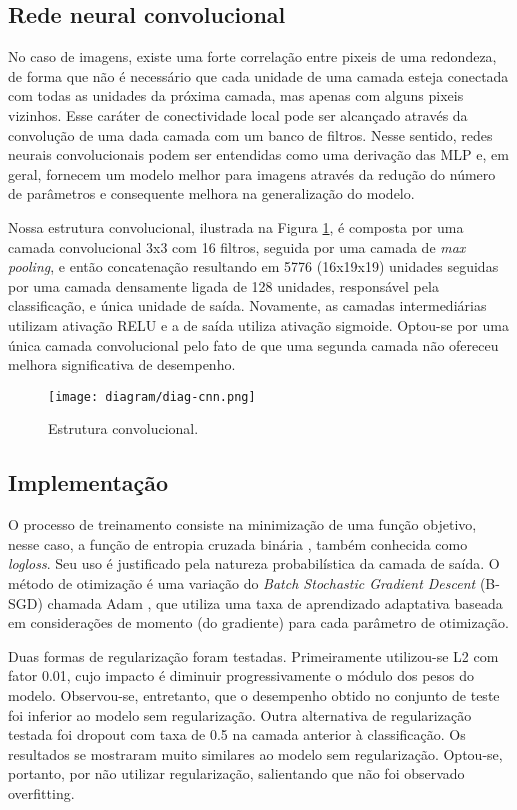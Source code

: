     \subsection{Rede neural convolucional}
         No caso de imagens, existe uma forte correlação entre pixeis de uma redondeza, de forma que não é necessário que cada unidade de uma camada esteja conectada com todas as unidades da próxima camada, mas apenas com alguns pixeis vizinhos. Esse caráter de conectividade local pode ser alcançado através da convolução de uma dada camada com um banco de filtros. Nesse sentido, redes neurais convolucionais podem ser entendidas como uma derivação das MLP e, em geral, fornecem um modelo melhor para imagens através da redução do número de parâmetros e consequente melhora na generalização do modelo.

         Nossa estrutura convolucional, ilustrada na Figura \ref{fig:diag-cnn}, é composta por uma camada convolucional 3x3 com 16 filtros, seguida por uma camada de \textit{max pooling}, e então concatenação resultando em 5776 (16x19x19) unidades seguidas por uma camada densamente ligada de 128 unidades, responsável pela classificação, e única unidade de saída. Novamente, as camadas intermediárias utilizam ativação RELU e a de saída utiliza ativação sigmoide. Optou-se por uma única camada convolucional pelo fato de que uma segunda camada não ofereceu melhora significativa de desempenho.

        \begin{figure}
        \centering
        \texttt{[image: diagram/diag-cnn.png]}
        \caption{Estrutura convolucional.}
        \label{fig:diag-cnn}
        \end{figure}

    \subsection{Implementação}
        O processo de treinamento consiste na minimização de uma função objetivo, nesse caso, a função de entropia cruzada binária \cite{DLbook}, também conhecida como \textit{logloss}. Seu uso é justificado pela natureza probabilística da camada de saída. O método de otimização é uma variação do \textit{Batch Stochastic Gradient Descent} (B-SGD) chamada Adam \cite{kingma2014adam}, que utiliza uma taxa de aprendizado adaptativa baseada em considerações de momento (do gradiente) para cada parâmetro de otimização.

        Duas formas de regularização foram testadas. Primeiramente utilizou-se L2 com fator 0.01, cujo impacto é diminuir progressivamente o módulo dos pesos do modelo. Observou-se, entretanto, que o desempenho obtido no conjunto de teste foi inferior ao modelo sem regularização. Outra alternativa de regularização testada foi dropout com taxa de 0.5 na camada anterior à classificação. Os resultados se mostraram muito similares ao modelo sem regularização. Optou-se, portanto, por não utilizar regularização, salientando que não foi observado overfitting.

